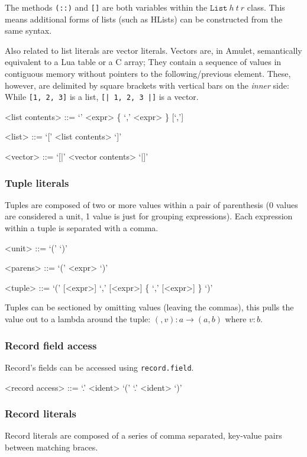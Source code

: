 The methods \texttt{(::)} and \texttt{[]} are both variables within the $\mathtt{List}\ h\ t\ r$ class. This means additional forms of lists (such as HLists) can be constructed from the same syntax.

Also related to list literals are vector literals. Vectors are, in Amulet, semantically equivalent to a Lua table or a C array; They contain a sequence of values in contiguous memory without pointers to the following/previous element. These, however, are delimited by square brackets with vertical bars on the \textit{inner} side: While \texttt{[1, 2, 3]} is a list, \texttt{[| 1, 2, 3 |]} is a vector.

\begin{grammar}
<list contents> ::= `'
               \alt <expr> \{ `,' <expr> \} [`,']

<list> ::= `[' <list contents> `]'

<vector> ::= `[|' <vector contents> `|]'
\end{grammar}

\subsubsection{Tuple literals}
Tuples are composed of two or more values within a pair of parenthesis (0 values are considered a unit, 1 value is just for grouping expressions). Each expression within a tuple is separated with a comma.

\begin{grammar}
<unit>   ::= `(' `)'

<parens> ::= `(' <expr> `)'

<tuple>  ::= `(' [<expr>] `,' [<expr>] \{ `,' [<expr>] \} `)'
\end{grammar}

Tuples can be sectioned by omitting values (leaving the commas), this pulls the value out to a lambda around the tuple: $(, v) : a \to (a, b)$ where $v : b$.

\subsubsection{Record field access}
Record's fields can be accessed using \texttt{record.field}.

\begin{grammar}
<record access> ::= `.' <ident>
               \alt `(' `.' <ident> `)'
\end{grammar}

\subsubsection{Record literals}
Record literals are composed of a series of comma separated, key-value pairs between matching braces.

